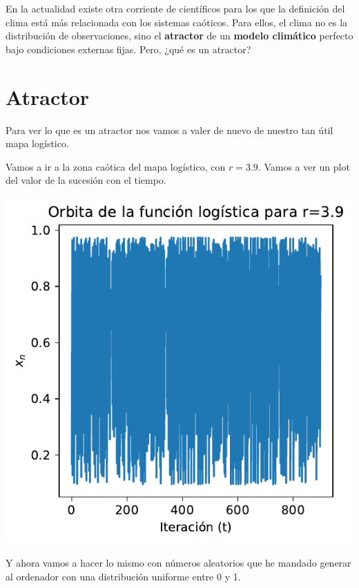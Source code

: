 \documentclass[
  10pt,
  a4paper,
  DIV=11,
  numbers=noendperiod,
  open=any]{scrreprt}
\makeatletter
\newcommand*\pandocbounded[1]{%
  \sbox\pandoc@box{#1}%
  \Gscale@div\@tempa{\textheight}{\dimexpr\ht\pandoc@box+\dp\pandoc@box\relax}%
  \Gscale@div\@tempb{\linewidth}{\wd\pandoc@box}%
  \ifdim\@tempb\p@<\@tempa\p@\let\@tempa\@tempb\fi%
  \ifdim\@tempa\p@<\p@\scalebox{\@tempa}{\usebox\pandoc@box}%
  \else\usebox{\pandoc@box}%
  \fi%
}
\numberwithin{equation}{chapter}
\numberwithin{equation}{section}
\renewcommand{\[}{\begin{equation}}
\renewcommand{\]}{\end{equation}}
\providecommand{\pandocbounded}[1]{#1}%
\renewcommand{\pandocbounded}[1]{\begingroup\centering #1\par\endgroup}
\makeatother
\begin{document}
En la actualidad existe otra corriente de científicos para los que la
definición del clima está más relacionada con los sistemas caóticos.
Para ellos, el clima no es la distribución de observaciones, sino el
\textbf{atractor} de un \textbf{modelo climático} perfecto bajo
condiciones externas fijas. Pero, ¿qué es un atractor?

\section{Atractor}\label{atractor}

Para ver lo que es un atractor nos vamos a valer de nuevo de nuestro tan
útil mapa logístico.

Vamos a ir a la zona caótica del mapa logístico, con \(r=3.9\). Vamos a
ver un plot del valor de la sucesión con el tiempo.

\pandocbounded{\includegraphics[keepaspectratio]{04-clima/atractor_files/figure-pdf/cell-2-output-1.pdf}}

Y ahora vamos a hacer lo mismo con números aleatorios que he mandado
generar al ordenador con una distribución uniforme entre 0 y 1.
\end{document}
